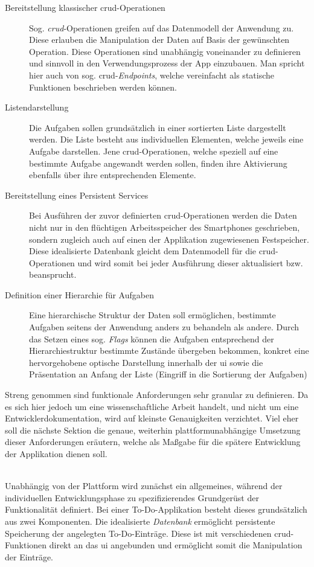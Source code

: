 \begin{description}
    \item[Bereitstellung klassischer \acs{crud}-Operationen] Sog. \textit{\ac{crud}}-Operationen greifen auf das Datenmodell der Anwendung zu. Diese erlauben die Manipulation der Daten auf Basis der gewünschten Operation. Diese Operationen sind unabhängig voneinander zu definieren und sinnvoll in den Verwendungsprozess der App einzubauen. Man spricht hier auch von sog. \ac{crud}-\textit{Endpoints}, welche vereinfacht als statische Funktionen beschrieben werden können.
    \item[Listendarstellung] Die Aufgaben sollen grundsätzlich in einer sortierten Liste dargestellt werden. Die Liste besteht aus individuellen Elementen, welche jeweils eine Aufgabe darstellen. Jene \ac{crud}-Operationen, welche speziell auf eine bestimmte Aufgabe angewandt werden sollen, finden ihre Aktivierung ebenfalls über ihre entsprechenden Elemente.
    \item[Bereitstellung eines Persistent Services] Bei Ausführen der zuvor definierten \ac{crud}-Operationen werden die Daten nicht nur in den flüchtigen Arbeitsspeicher des Smartphones geschrieben, sondern zugleich auch auf einen der Applikation zugewiesenen Festspeicher. Diese idealisierte Datenbank gleicht dem Datenmodell für die \ac{crud}-Operationen und wird somit bei jeder Ausführung dieser aktualisiert bzw. beansprucht.
    \item[Definition einer Hierarchie für Aufgaben] Eine hierarchische Struktur der Daten soll ermöglichen, bestimmte Aufgaben seitens der Anwendung anders zu behandeln als andere. Durch das Setzen eines sog. \textit{Flags} können die Aufgaben entsprechend der Hierarchiestruktur bestimmte Zustände übergeben bekommen, konkret eine hervorgehobene optische Darstellung innerhalb der \ac{ui} sowie die Präsentation an Anfang der Liste (Eingriff in die Sortierung der Aufgaben)
\end{description}


Streng genommen sind funktionale Anforderungen sehr granular zu definieren. Da es sich hier jedoch um eine wissenschaftliche Arbeit handelt, und nicht um eine Entwicklerdokumentation, wird auf kleinste Genauigkeiten verzichtet. Viel eher soll die nächste Sektion die genaue, weiterhin plattformunabhängige Umsetzung dieser Anforderungen eräutern, welche als Maßgabe für die spätere Entwicklung der Applikation dienen soll. \\\

Unabhängig von der Plattform wird zunächst ein allgemeines, während der individuellen Entwicklungsphase zu spezifizierendes Grundgerüst der Funktionalität definiert. Bei einer To-Do-Applikation besteht dieses grundsätzlich aus zwei Komponenten. Die idealisierte \textit{Datenbank} ermöglicht persistente Speicherung der angelegten To-Do-Einträge. Diese ist mit verschiedenen \ac{crud}-Funktionen direkt an das \ac{ui} angebunden und ermöglicht somit die Manipulation der Einträge.